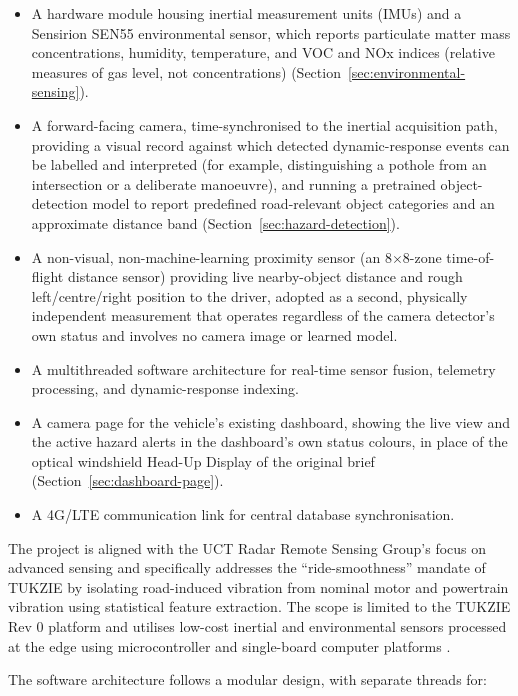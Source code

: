 \begin{itemize}
\item A hardware module housing inertial measurement units (IMUs) and a Sensirion SEN55 environmental sensor, which reports particulate matter mass concentrations, humidity, temperature, and VOC and NOx indices (relative measures of gas level, not concentrations) (Section~\ref{sec:environmental-sensing}).
\item A forward-facing camera, time-synchronised to the inertial acquisition path, providing a visual record against which detected dynamic-response events can be labelled and interpreted (for example, distinguishing a pothole from an intersection or a deliberate manoeuvre), and running a pretrained object-detection model to report predefined road-relevant object categories and an approximate distance band (Section~\ref{sec:hazard-detection}).
\item A non-visual, non-machine-learning proximity sensor (an 8$\times$8-zone time-of-flight distance sensor) providing live nearby-object distance and rough left/centre/right position to the driver, adopted as a second, physically independent measurement that operates regardless of the camera detector's own status and involves no camera image or learned model.
\item A multithreaded software architecture for real-time sensor fusion, telemetry processing, and dynamic-response indexing.
\item A camera page for the vehicle's existing dashboard, showing the live view and the active hazard alerts in the dashboard's own status colours, in place of the optical windshield Head-Up Display of the original brief (Section~\ref{sec:dashboard-page}).
\item A 4G/LTE communication link for central database synchronisation.
\end{itemize}

The project is aligned with the UCT Radar Remote Sensing Group's focus on advanced sensing and specifically addresses the ``ride-smoothness'' mandate of TUKZIE by isolating road-induced vibration from nominal motor and powertrain vibration using statistical feature extraction. The scope is limited to the TUKZIE Rev 0 platform and utilises low-cost inertial and environmental sensors processed at the edge using microcontroller and single-board computer platforms \cite{alatoom2025}.

The software architecture follows a modular design, with separate threads for:

